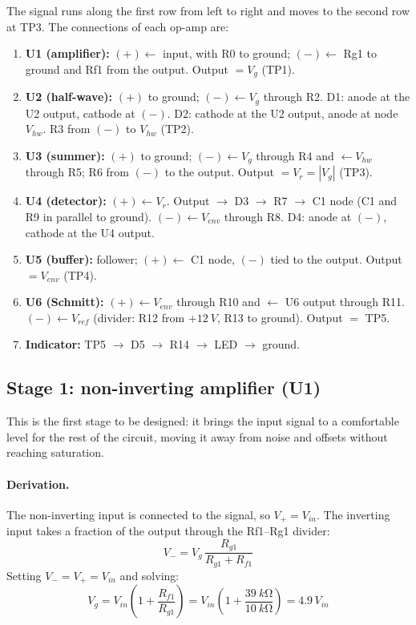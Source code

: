 \documentclass[11pt,letterpaper]{article}
\newcommand{\Vg}{V_g}
\newcommand{\Vr}{V_r}
\newcommand{\Venv}{V_{env}}
\newcommand{\Vref}{V_{ref}}
\begin{document}
The signal runs along the first row from left to right and moves to the second row at TP3. The connections of each op-amp are:
\begin{enumerate}
  \item \textbf{U1 (amplifier):} $(+)\leftarrow$ input, with R0 to ground; $(-)\leftarrow$ Rg1 to ground and Rf1 from the output. Output $=\Vg$ (TP1).
  \item \textbf{U2 (half-wave):} $(+)$ to ground; $(-)\leftarrow\Vg$ through R2. D1: anode at the U2 output, cathode at $(-)$. D2: cathode at the U2 output, anode at node $V_{hw}$. R3 from $(-)$ to $V_{hw}$ (TP2).
  \item \textbf{U3 (summer):} $(+)$ to ground; $(-)\leftarrow\Vg$ through R4 and $\leftarrow V_{hw}$ through R5; R6 from $(-)$ to the output. Output $=\Vr=|\Vg|$ (TP3).
  \item \textbf{U4 (detector):} $(+)\leftarrow\Vr$. Output $\rightarrow$ D3 $\rightarrow$ R7 $\rightarrow$ C1 node (C1 and R9 in parallel to ground). $(-)\leftarrow\Venv$ through R8. D4: anode at $(-)$, cathode at the U4 output.
  \item \textbf{U5 (buffer):} follower; $(+)\leftarrow$ C1 node, $(-)$ tied to the output. Output $=\Venv$ (TP4).
  \item \textbf{U6 (Schmitt):} $(+)\leftarrow\Venv$ through R10 and $\leftarrow$ U6 output through R11. $(-)\leftarrow\Vref$ (divider: R12 from $+\SI{12}{V}$, R13 to ground). Output $=$ TP5.
  \item \textbf{Indicator:} TP5 $\rightarrow$ D5 $\rightarrow$ R14 $\rightarrow$ LED $\rightarrow$ ground.
\end{enumerate}

\subsection{Stage 1: non-inverting amplifier (U1)}

This is the first stage to be designed: it brings the input signal to a comfortable level for the rest of the circuit, moving it away from noise and offsets without reaching saturation.

\paragraph{Derivation.} The non-inverting input is connected to the signal, so $V_+=V_{in}$. The inverting input takes a fraction of the output through the Rf1--Rg1 divider:
\begin{equation}
V_- = \Vg\,\frac{R_{g1}}{R_{g1}+R_{f1}}
\end{equation}
Setting $V_-=V_+=V_{in}$ and solving:
\begin{equation}
\Vg = V_{in}\left(1+\frac{R_{f1}}{R_{g1}}\right) = V_{in}\left(1+\frac{\SI{39}{k\ohm}}{\SI{10}{k\ohm}}\right) = 4.9\,V_{in}
\label{eq:ganancia}
\end{equation}
\end{document}
